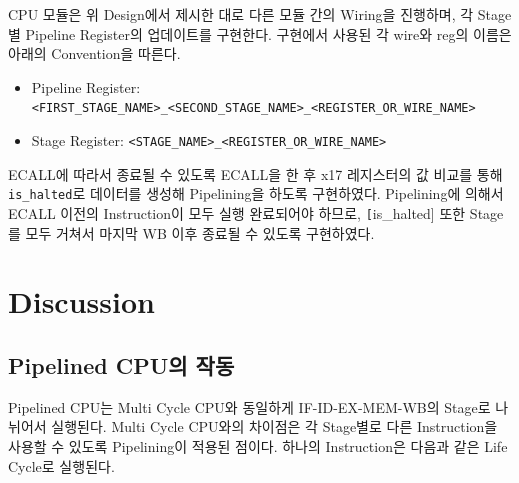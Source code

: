 \documentclass[openright, a4paper]{article}
\newcommand{\code}[1]{\texttt{#1}}
\begin{document}
CPU 모듈은 위 Design에서 제시한 대로 다른 모듈 간의 Wiring을 진행하며, 각 Stage별 Pipeline Register의 업데이트를 구현한다. 구현에서 사용된 각 wire와 reg의 이름은 아래의 Convention을 따른다.

\begin{itemize}
    \item Pipeline Register: \code{<FIRST_STAGE_NAME>_<SECOND_STAGE_NAME>_<REGISTER_OR_WIRE_NAME>}
    \item Stage Register: \code{<STAGE_NAME>_<REGISTER_OR_WIRE_NAME>}
\end{itemize}

ECALL에 따라서 종료될 수 있도록 ECALL을 한 후 x17 레지스터의 값 비교를 통해 \code{is_halted}로 데이터를 생성해 Pipelining을 하도록 구현하였다. Pipelining에 의해서 ECALL 이전의 Instruction이 모두 실행 완료되어야 하므로, \code[is_halted] 또한 Stage를 모두 거쳐서 마지막 WB 이후 종료될 수 있도록 구현하였다.


\section{Discussion}

\subsection{Pipelined CPU의 작동}

Pipelined CPU는 Multi Cycle CPU와 동일하게 IF-ID-EX-MEM-WB의 Stage로 나뉘어서 실행된다. Multi Cycle CPU와의 차이점은 각 Stage별로 다른 Instruction을 사용할 수 있도록 Pipelining이 적용된 점이다. 하나의 Instruction은 다음과 같은 Life Cycle로 실행된다.
\end{document}
